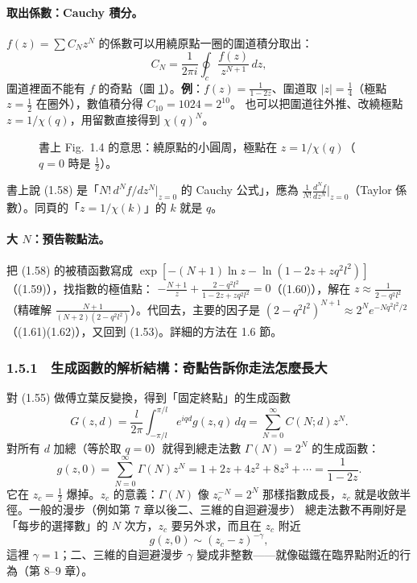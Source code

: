 \paragraph{取出係數：Cauchy 積分。}
$f(z)=\sum C_Nz^N$ 的係數可以用繞原點一圈的圍道積分取出：
\begin{equation}
C_N=\frac1{2\pi i}\oint_c\frac{f(z)}{z^{N+1}}\,dz, \tag{1.58}
\end{equation}
圍道裡面不能有 $f$ 的奇點（圖 \ref{fig:contour}）。\textbf{例}：$f(z)=\frac1{1-2z}$、圍道取 $|z|=\frac14$（極點 $z=\frac12$ 在圈外），數值積分得 $C_{10}=1024=2^{10}$。
也可以把圍道往外推、改繞極點 $z=1/\chi(q)$，用留數直接得到 $\chi(q)^N$。

\begin{figure}[H]
\centering
\FigContour
\caption{書上 Fig.~1.4 的意思：繞原點的小圓周，極點在 $z=1/\chi(q)$（$q=0$ 時是 $\tfrac12$）。}
\label{fig:contour}
\end{figure}

\begin{errbox}[p.~17，(1.58) 後]
書上說 (1.58) 是「$N!\,d^N f/dz^N|_{z=0}$ 的 Cauchy 公式」，應為 $\frac{1}{N!}\frac{d^Nf}{dz^N}\big|_{z=0}$（Taylor 係數）。同頁的「$z=1/\chi(k)$」的 $k$ 就是 $q$。
\end{errbox}

\paragraph{大 $N$：預告鞍點法。}
 把 (1.58) 的被積函數寫成 $\exp[-(N+1)\ln z-\ln(1-2z+zq^2l^2)]$（(1.59)），找指數的極值點：
$-\frac{N+1}{z}+\frac{2-q^2l^2}{1-2z+zq^2l^2}=0$（(1.60)），解在 $z\approx\frac1{2-q^2l^2}$（精確解 $\frac{N+1}{(N+2)(2-q^2l^2)}$）。代回去，主要的因子是
$(2-q^2l^2)^{N+1}\approx2^Ne^{-Nq^2l^2/2}$（(1.61)(1.62)），又回到 (1.53)。詳細的方法在 1.6 節。

\subsubsection*{1.5.1　生成函數的解析結構：奇點告訴你走法怎麼長大}
對 (1.55) 做傅立葉反變換，得到「固定終點」的生成函數
\begin{equation}
G(z,d)=\frac{l}{2\pi}\int_{-\pi/l}^{\pi/l}e^{iqd}g(z,q)\,dq=\sum_{N=0}^\infty C(N;d)z^N. \tag{1.63}
\end{equation}
對所有 $d$ 加總（等於取 $q=0$）就得到總走法數 $\Gamma(N)=2^N$ 的生成函數：
\begin{equation}
g(z,0)=\sum_{N=0}^\infty\Gamma(N)z^N=1+2z+4z^2+8z^3+\cdots=\frac{1}{1-2z}. \tag{1.64--1.65}
\end{equation}
它在 $z_c=\frac12$ 爆掉。$z_c$ 的意義：$\Gamma(N)$ 像 $z_c^{-N}=2^N$ 那樣指數成長，$z_c$ 就是收斂半徑。一般的漫步（例如第 7 章以後二、三維的自迴避漫步）
總走法數不再剛好是「每步的選擇數」的 $N$ 次方，$z_c$ 要另外求，而且在 $z_c$ 附近
\begin{equation}
g(z,0)\sim(z_c-z)^{-\gamma}, \tag{1.66}
\end{equation}
這裡 $\gamma=1$；二、三維的自迴避漫步 $\gamma$ 變成非整數——就像磁鐵在臨界點附近的行為（第 8--9 章）。

